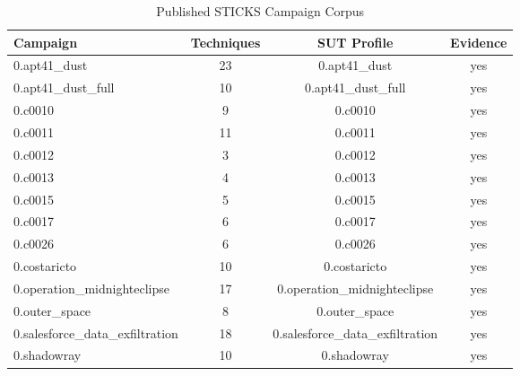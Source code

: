 \begin{table}[htbp]
\centering
\caption{Published STICKS Campaign Corpus}
\label{tab:corpus}
\begin{tabular}{lccc}
\toprule
Campaign & Techniques & SUT Profile & Evidence \\
\midrule
0.apt41_dust & 23 & 0.apt41_dust & yes \\
0.apt41_dust_full & 10 & 0.apt41_dust_full & yes \\
0.c0010 & 9 & 0.c0010 & yes \\
0.c0011 & 11 & 0.c0011 & yes \\
0.c0012 & 3 & 0.c0012 & yes \\
0.c0013 & 4 & 0.c0013 & yes \\
0.c0015 & 5 & 0.c0015 & yes \\
0.c0017 & 6 & 0.c0017 & yes \\
0.c0026 & 6 & 0.c0026 & yes \\
0.costaricto & 10 & 0.costaricto & yes \\
0.operation_midnighteclipse & 17 & 0.operation_midnighteclipse & yes \\
0.outer_space & 8 & 0.outer_space & yes \\
0.salesforce_data_exfiltration & 18 & 0.salesforce_data_exfiltration & yes \\
0.shadowray & 10 & 0.shadowray & yes \\
\bottomrule
\end{tabular}
\end{table}
